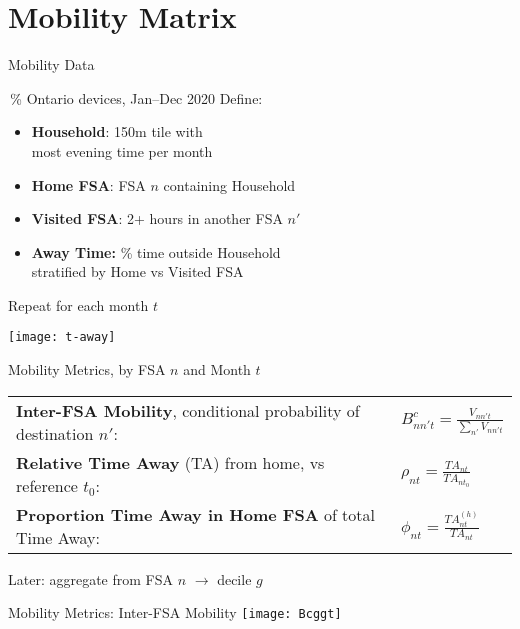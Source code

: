 \section{Mobility Matrix}
\begin{frame}{Mobility Data}
  \begin{minipage}{0.55\textwidth}
    \,\% Ontario devices, Jan--Dec 2020
    \medpar
    Define:
    \begin{itemize}
      \item \textbf{Household}: \ttilde 150m tile with\\
      most evening time per month
      \item \textbf{Home FSA}: FSA $n$ containing Household
      \item \textbf{Visited FSA}: 2+ hours in another FSA $n'$
      \item \textbf{Away Time:} \% time outside Household\\
      stratified by Home vs Visited FSA
    \end{itemize}
    \medpar
    Repeat for each month $t$
  \end{minipage}%
  \begin{minipage}{0.45\textwidth}
    \texttt{[image: t-away]}
  \end{minipage}
\end{frame}
\begin{frame}{Mobility Metrics, by FSA $n$ and Month $t$}
  \bigpar
  \begin{tabular}{ll}
    \textbf{Inter-FSA Mobility}, conditional probability of destination $n'$: &
    $\displaystyle B^c_{nn't} = \frac{V_{nn't}}{\sum_{n'}V_{nn't}}$
    \\[\eqtabsep]
    \textbf{Relative Time Away} (TA) from home, vs reference $t_0$: &
    $\displaystyle\rho_{nt} = \frac{{TA}_{nt}}{{TA}_{nt_0}}$
    \\[\eqtabsep]
    \textbf{Proportion Time Away in Home FSA} of total Time Away: &
    $\displaystyle\phi_{nt} = \frac{{TA}^{(h)}_{nt}}{{TA}_{nt}}$
    \\[\eqtabsep]
  \end{tabular}
  \bigpar
  Later: aggregate from FSA $n$ $\rightarrow$ decile $g$
\end{frame}
\begin{frame}{Mobility Metrics: Inter-FSA Mobility}
  \centering
  \texttt{[image: Bcggt]}
\end{frame}
